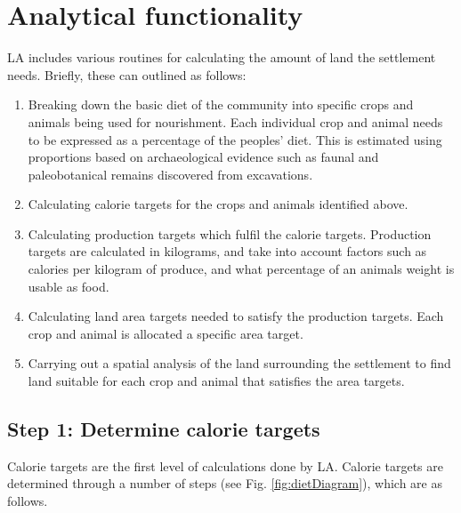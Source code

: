 \section{Analytical functionality} \label{sec:Analytical Functionality}

LA includes various routines for calculating the amount of land 
the settlement needs.  Briefly, these can outlined as follows:

  \begin{enumerate} 
  \item Breaking down the basic diet of the community into specific crops and
  animals being used for nourishment.  Each individual crop and animal needs to
  be expressed as a percentage of the peoples' diet.  This is estimated using
  proportions based on archaeological evidence such as faunal and
  paleobotanical remains discovered from excavations.  
  \item Calculating  calorie targets for the crops and animals identified above.
 
  \item Calculating production targets which fulfil the calorie targets.
  Production targets are calculated in kilograms, and take into account factors
  such as calories per kilogram of produce, and what percentage of an animals
  weight is usable as food.  
  \item Calculating land area targets needed to satisfy the production targets.
  Each crop and animal is allocated a specific area target.  
  \item Carrying out a spatial analysis of the land surrounding the settlement
  to find land suitable for each crop and animal that satisfies the area
  targets.  
  \end{enumerate}

\subsection{Step 1: Determine calorie targets}
  Calorie targets are the first level of calculations done by LA.  Calorie
  targets are determined through a number of steps (see Fig.
  \ref{fig:dietDiagram}), which are as follows.


